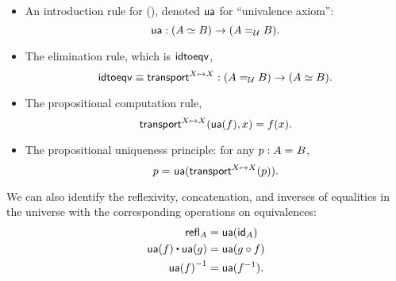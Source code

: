 \documentclass[hott-all.tex]{subfiles}
\begin{document}
%
%

\begin{itemize}
\item An introduction rule for {()}, denoted $\ua$ for ``univalence axiom'':
  \[
  \ua : ({\eqv A B}) \to (\id[\type]{A}{B}).
  \]
\item The elimination rule, which is $\idtoeqv$,
  \[
  \idtoeqv \jdeq \transfibf{X \mapsto X} : (\id[\type]{A}{B}) \to (\eqv A B).
  \]
\item The propositional computation rule,
  \[
  \transfib{X \mapsto X}{\ua(f)}{x} = f(x).
  \]
\item The propositional uniqueness principle: 
  for any $p : \id A B$,
  \[
  \id{p}{\ua(\transfibf{X \mapsto X}(p))}.
  \]
\end{itemize}
%
We can also identify the reflexivity, concatenation, and inverses of equalities in the universe with the corresponding operations on equivalences:
\begin{align*}
  \refl{A} &= \ua(\idfunc[A]) \\
  \ua(f) \ct \ua(g) &= \ua(g\circ f) \\
  \opp{\ua(f)} &= \ua(f^{-1}).
\end{align*}
\end{document}
